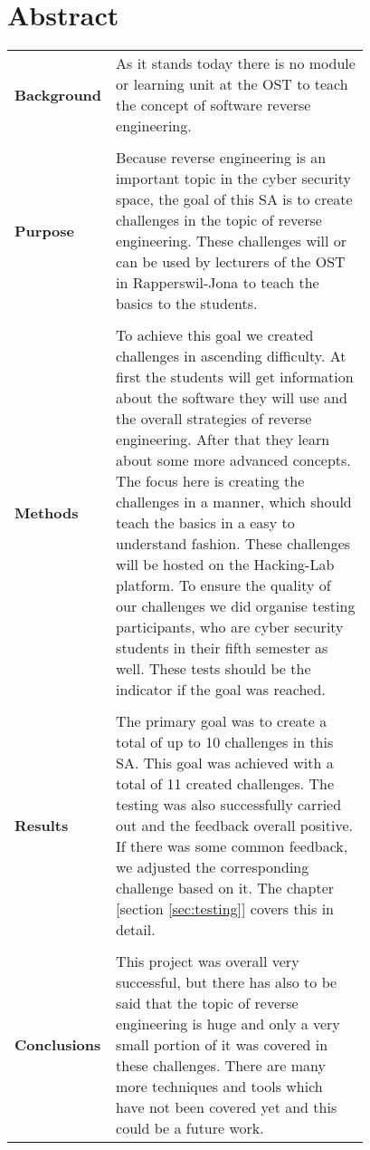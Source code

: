 \chapter{Abstract}
\begin{table}[H]
    \begin{tabular}{lp{0.78\linewidth}}
    \textbf{Background} & As it stands today there is no module or learning unit at the OST to teach the concept of software reverse engineering. \\
    \\
    \textbf{Purpose}    & Because reverse engineering is an important topic in the cyber security space, the goal of this SA is to create challenges in the topic of reverse engineering. These challenges will or can be used by lecturers of the OST in Rapperswil-Jona to teach the basics to the students. \\
    \\
    \textbf{Methods}    & To achieve this goal we created challenges in ascending difficulty. At first the students will get information about the software they will use and the overall strategies of reverse engineering. After that they learn about some more advanced concepts. The focus here is creating the challenges in a manner, which should teach the basics in a easy to understand fashion. These challenges will be hosted on the Hacking-Lab platform. To ensure the quality of our challenges we did organise testing participants, who are cyber security students in their fifth semester as well. These tests should be the indicator if the goal was reached. \\
    \\
    \textbf{Results}    & The primary goal was to create a total of up to 10 challenges in this SA. This goal was achieved with a total of 11 created challenges. The testing was also successfully carried out and the feedback overall positive. If there was some common feedback, we adjusted the corresponding challenge based on it. The chapter [section \ref{sec:testing}] covers this in detail. \\
    \\
    \textbf{Conclusions} & This project was overall very successful, but there has also to be said that the topic of reverse engineering is huge and only a very small portion of it was covered in these challenges. There are many more techniques and tools which have not been covered yet and this could be a future work. 
    \end{tabular}
    \end{table}
